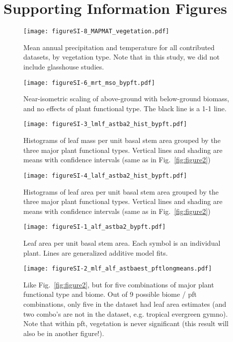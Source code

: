 \documentclass[a4paper]{article}\usepackage[]{graphicx}\usepackage[]{color}
\begin{document}
\clearpage
\section{Supporting Information Figures}


\begin{figure}[h!]
    \centering
    \texttt{[image: figureSI-8\_MAPMAT\_vegetation.pdf]}
    \caption{Mean annual precipitation and temperature for all contributed datasets, by vegetation type. Note that in this study, we did not include glasshouse studies.}
    \label{fig:figureSI8}
\end{figure}

\begin{figure}[h!]
    \centering
    \texttt{[image: figureSI-6\_mrt\_mso\_bypft.pdf]}
    \caption{Near-isometric scaling of above-ground with below-ground biomass, and no effects of plant functional type. The black line is a 1-1 line.}
    \label{fig:figureSI6}
\end{figure}

\begin{figure}[h!]
    \centering
    \texttt{[image: figureSI-3\_lmlf\_astba2\_hist\_bypft.pdf]}
    \caption{Histograms of leaf mass per unit basal stem area grouped by the three major plant functional types. Vertical lines and shading are means with confidence intervals (same as in Fig.~\ref{fig:figure2})}
    \label{fig:figureSI3}
\end{figure}

\begin{figure}[h!]
    \centering
    \texttt{[image: figureSI-4\_lalf\_astba2\_hist\_bypft.pdf]}
    \caption{Histograms of leaf area per unit basal stem area grouped by the three major plant functional types. Vertical lines and shading are means with confidence intervals (same as in Fig.~\ref{fig:figure2})}
    \label{fig:figureSI4}
\end{figure}


\begin{figure}[h!]
    \centering
    \texttt{[image: figureSI-1\_alf\_astba2\_bypft.pdf]}
    \caption{Leaf area per unit basal stem area. Each symbol is an individual plant. Lines are generalized additive model fits.}
    \label{fig:figureSI1}
\end{figure}

\begin{figure}[h!]
    \centering
    \texttt{[image: figureSI-2\_mlf\_alf\_astbaest\_pftlongmeans.pdf]}
    \caption{Like Fig.~\ref{fig:figure2}, but for five combinations of major plant functional type and biome. Out of 9 possible biome / pft combinations, only five in the dataset had leaf area estimates (and two combo's are not in the dataset, e.g. tropical evergreen gymno). Note that within pft, vegetation is never significant (this result will also be in another figure!).}
    \label{fig:figureSI2}
\end{figure}
\end{document}
